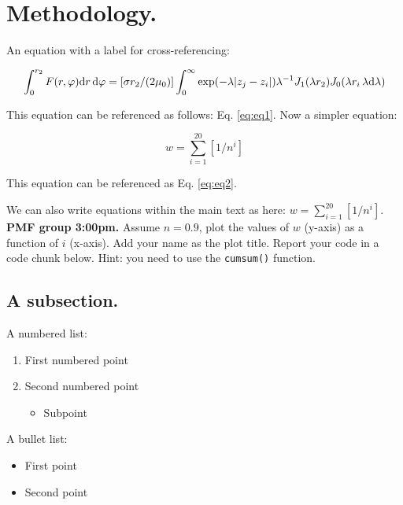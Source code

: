 \documentclass[12pt,halfline,a4paper,]{ouparticle}
\providecommand{\tightlist}{%
  \setlength{\itemsep}{0pt}\setlength{\parskip}{0pt}}
\begin{document}
\hypertarget{methodology.}{%
\section{Methodology.}\label{methodology.}}

An equation with a label for cross-referencing:

\begin{equation}\label{eq:eq1}
\int^{r_2}_0 F(r,\varphi){\rm d}r\,{\rm d}\varphi = [\sigma r_2/(2\mu_0)]
\int^{\infty}_0\exp(-\lambda|z_j-z_i|)\lambda^{-1}J_1 (\lambda r_2)J_0
(\lambda r_i\,\lambda {\rm d}\lambda)
\end{equation}

This equation can be referenced as follows: Eq. \ref{eq:eq1}. Now a
simpler equation:

\begin{equation}\label{eq:eq2}
w=\sum^{20}_{i=1}[1/n^i]
\end{equation}

This equation can be referenced as Eq. \ref{eq:eq2}.

We can also write equations within the main text as here:
\(w=\sum^{20}_{i=1}[1/n^i]\).\\

\textbf{PMF group 3:00pm.} Assume \(n=0.9\), plot the values of \(w\)
(y-axis) as a function of \(i\) (x-axis). Add your name as the plot
title. Report your code in a code chunk below. Hint: you need to use the
\texttt{cumsum()} function.

\hypertarget{a-subsection.}{%
\subsection{A subsection.}\label{a-subsection.}}

A numbered list:

\begin{enumerate}
\def\labelenumi{\arabic{enumi})}
\item
  First numbered point
\item
  Second numbered point

  \begin{itemize}
  \tightlist
  \item
    Subpoint
  \end{itemize}
\end{enumerate}

A bullet list:

\begin{itemize}
\tightlist
\item
  First point
\item
  Second point
\end{itemize}
\end{document}

